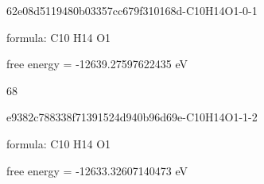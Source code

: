 \documentclass{article}
\begin{document}
\vspace{1cm}


62e08d5119480b03357cc679f310168d-C10H14O1-0-1



formula: C10 H14 O1



free energy = -12639.27597622435 eV

68

\vspace{1cm}


e9382c788338f71391524d940b96d69e-C10H14O1-1-2



formula: C10 H14 O1



free energy = -12633.32607140473 eV
\end{document}
